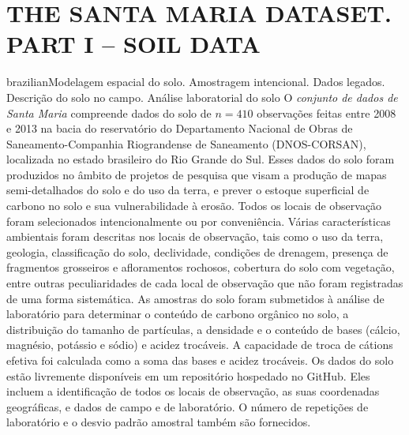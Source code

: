 \artigotrue
\chapter{THE SANTA MARIA DATASET. PART I -- SOIL DATA}
\label{chap:chap04}


\def\ptkeys{Modelagem espacial do solo. Amostragem intencional. Dados legados. Descrição do solo no campo. 
Análise laboratorial do solo}
\begin{chapterabstract}{brazilian}{\ptkeys}
O \emph{conjunto de dados de Santa Maria} compreende dados do solo de $n = 410$  observações feitas entre 
2008 e 2013 na bacia do reservatório do Departamento Nacional de Obras de Saneamento-Companhia Riograndense de 
Saneamento (DNOS-CORSAN), localizada no estado brasileiro do Rio Grande do Sul. Esses dados do solo foram 
produzidos no âmbito de projetos de pesquisa que visam a produção de mapas semi-detalhados do solo e do
uso da terra, e prever o estoque superficial de carbono no solo e sua vulnerabilidade à erosão. Todos os 
locais de observação foram selecionados intencionalmente ou por conveniência. Várias características 
ambientais foram descritas nos locais de observação, tais como o uso da terra, geologia, classificação do 
solo, declividade, condições de drenagem, presença de fragmentos grosseiros e afloramentos rochosos, cobertura 
do solo com vegetação, entre outras peculiaridades de cada local de observação que não foram registradas de 
uma forma sistemática. As amostras do solo foram submetidos à análise de laboratório para determinar o 
conteúdo de carbono orgânico no solo, a distribuição do tamanho de partículas, a densidade e o conteúdo de 
bases (cálcio, magnésio, potássio e sódio) e acidez trocáveis. A capacidade de troca de cátions efetiva foi 
calculada como a soma das bases e acidez trocáveis. Os dados do solo estão livremente disponíveis em um 
repositório hospedado no GitHub. Eles incluem a identificação de todos os locais de observação, as suas 
coordenadas geográficas, e dados de campo e de laboratório. O número de repetições de laboratório e o desvio 
padrão amostral também são fornecidos.

\end{chapterabstract}

